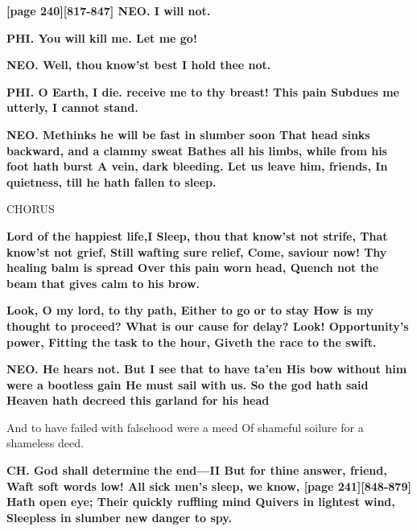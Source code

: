 \documentclass[11pt,letter]{book}
\begin{document}
\par \textbf{[page 240][817-847] NEO. I will not.}
\par 

\par \textbf{PHI. You will kill me. Let me go!}
\par 

\par \textbf{NEO. Well, thou know’st best I hold thee not.}
\par 

\par \textbf{PHI. O Earth, I die. receive me to thy breast! This pain Subdues me utterly, I cannot stand.}
\par 

\par \textbf{NEO. Methinks he will be fast in slumber soon That head sinks backward, and a clammy sweat Bathes all his limbs, while from his foot hath burst A vein, dark bleeding. Let us leave him, friends, In quietness, till he hath fallen to sleep.}
\par 

\par  CHORUS

\par \textbf{Lord of the happiest life,I Sleep, thou that know’st not strife, That know’st not grief, Still wafting sure relief, Come, saviour now! Thy healing balm is spread Over this pain worn head, Quench not the beam that gives calm to his brow.}
\par 

\par \textbf{Look, O my lord, to thy path, Either to go or to stay How is my thought to proceed? What is our cause for delay? Look! Opportunity’s power, Fitting the task to the hour, Giveth the race to the swift.}
\par 

\par \textbf{NEO. He hears not. But I see that to have ta’en His bow without him were a bootless gain He must sail with us. So the god hath said Heaven hath decreed this garland for his head}
\par   And to have failed with falsehood were a meed Of shameful soilure for a shameless deed.

\par \textbf{CH. God shall determine the end—II But for thine answer, friend, Waft soft words low! All sick men’s sleep, we know, [page 241][848-879] Hath open eye; Their quickly ruffling mind Quivers in lightest wind, Sleepless in slumber new danger to spy.}
\par 
\end{document}

